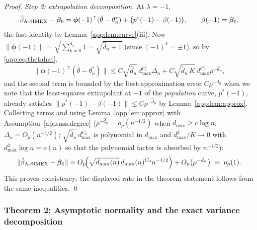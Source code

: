 \documentclass[11pt]{article}
\theoremstyle{plain}
\theoremstyle{definition}
\newcommand{\bet}{\bm{\beta}}
\newcommand{\bphi}{\bm{\phi}}
\newcommand{\asimex}{\textup{A-SIMEX}}
\begin{document}
\begin{proof}
\emph{Step 2: extrapolation decomposition.} At $\lambda=-1$,
\[
  \hat\beta_{\asimex}-\bet_0
  =\bphi(-1)^\top(\hat\theta-\theta^*_n)
  +\bigl(p^*(-1)-\beta(-1)\bigr),
  \qquad \beta(-1)=\bet_0,
\]
the last identity by Lemma~\ref{app:lem:curve}(iii). Now
$\|\bphi(-1)\|=\sqrt{\sum_{k=0}^{\hat d_n}1}=\sqrt{\hat d_n+1}$ (since
$(-1)^k=\pm 1$), so by \eqref{app:eq:thetahat},
\[
  \|\bphi(-1)^\top(\hat\theta-\theta^*_n)\|
  \le C\sqrt{\hat d_n}\,d_{\max}^{C_0}\Delta_n
    + C\sqrt{\hat d_n\,K}\,d_{\max}^{C_0}\rho^{-\hat d_n},
\]
and the second term is bounded by the best-approximation error
$C\rho^{-\hat d_n}$ when we note that the least-squares extrapolant at
$-1$ of the \emph{population} curve, $p^*(-1)$, already satisfies
$\|p^*(-1)-\beta(-1)\|\le C\rho^{-\hat d_n}$ by
Lemma~\ref{app:lem:approx}. Collecting terms and using
Lemma~\ref{app:lem:approx} with Assumption~\ref{app:ass:degree}
($\rho^{-\hat d_n}=o_p(n^{-1/2})$ when $d_{\max}\ge c\log n$;
$\Delta_n=O_p(n^{-1/2})$; $\sqrt{\hat d_n}\,d_{\max}^{C_0}$ is polynomial
in $d_{\max}$ and $d_{\max}^3/K\to 0$ with $d_{\max}^2\log n=o(n)$
so that the polynomial factor is absorbed by $n^{-1/2}$):
\[
  \|\hat\beta_{\asimex}-\bet_0\|
  =O_p\!\Bigl(\sqrt{d_{\max}(n)}\,d_{\max}(n)^{C_0}n^{-1/2}\Bigr)
   +O_p\bigl(\rho^{-\hat d_n}\bigr)
  \;=\;o_p(1).
\]
This proves consistency; the displayed rate in the theorem statement
follows from the same inequalities. \qed
\end{proof}

\subsubsection{Theorem 2: Asymptotic normality and the exact variance
decomposition}\label{app:sec:an}
\end{document}
